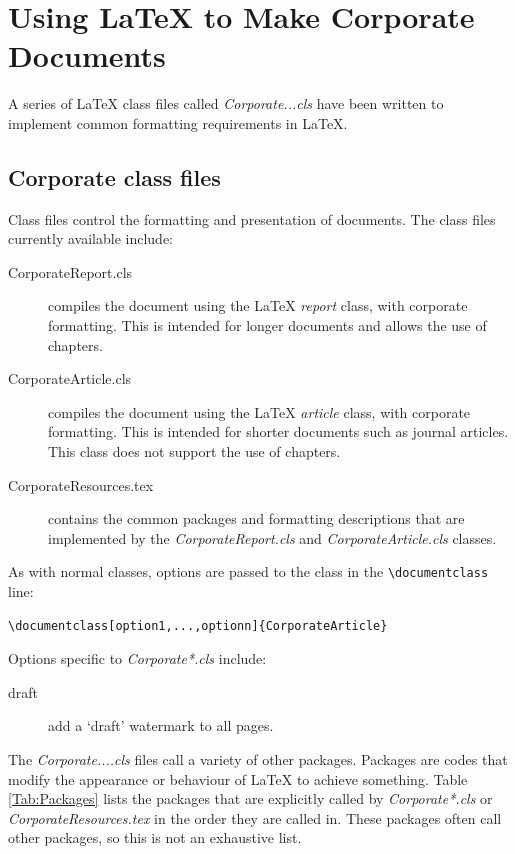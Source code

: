 \section{Using LaTeX to Make Corporate Documents }
A series of LaTeX class files called \emph{Corporate...cls} have been written to implement common formatting requirements in LaTeX.

\subsection{Corporate class files}\label{sec:Corporatecls}
Class files control the formatting and presentation of documents. The class files currently available include:
\begin{description}
\item[CorporateReport.cls]{compiles the document using the LaTeX \emph{report} class, with corporate formatting. This is intended for longer documents and allows the use of chapters.}
\item[CorporateArticle.cls] compiles the document using the LaTeX \emph{article} class, with corporate formatting. This is intended for shorter documents such as journal articles. This class does not support the use of chapters.
\item[CorporateResources.tex] contains the common packages and formatting descriptions that are implemented by the \emph{CorporateReport.cls} and \emph{CorporateArticle.cls} classes.
\end{description}

As with normal classes, options are passed to the class in the \verb+\documentclass+ line:

\begin{lstlisting}
\documentclass[option1,...,optionn]{CorporateArticle}
\end{lstlisting}

Options specific to \emph{Corporate*.cls} include:
\begin{description}
\item[draft]{add a `draft' watermark to all pages.}
\end{description}

The \emph{Corporate....cls} files call a variety of other packages. Packages are codes that modify the appearance or behaviour of LaTeX to achieve something. Table \ref{Tab:Packages} lists the packages that are explicitly called by \emph{Corporate*.cls} or \emph{CorporateResources.tex} in the order they are called in. These packages often call other packages, so this is not an exhaustive list.

